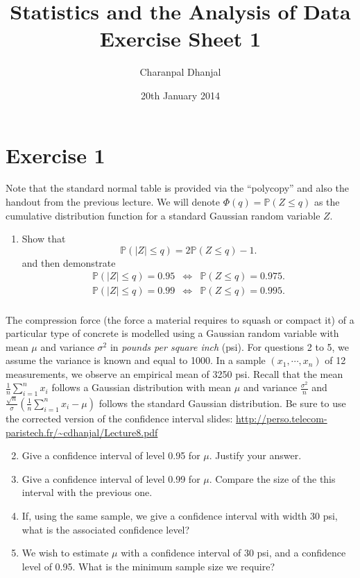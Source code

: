 \documentclass[a4paper,10pt]{article}
\title{Statistics and the Analysis of Data\\ Exercise Sheet 1}
\author{Charanpal Dhanjal}
\begin{document}
\date{20th January 2014}
\maketitle

\section*{Exercise 1}

Note that the standard normal table is provided via the ``polycopy'' and also the handout from the previous lecture. We will denote $\Phi(q)= \mathbb{P}(Z\le q)$ as the cumulative distribution function for a standard Gaussian random variable $Z$. 

\begin{enumerate} 
 

\item  Show that
\begin{equation}\label{eq:quantile}
\mathbb{P} (|Z|\le q) = 2 \mathbb{P} (Z\le q) -1.
\end{equation}
and then demonstrate
\begin{eqnarray*}
\mathbb{P}(|Z|\le q ) = 0.95 &\Leftrightarrow & \mathbb{P} ( Z\le q) = 0.975.\\
\mathbb{P}(|Z|\le q ) = 0.99 &\Leftrightarrow & \mathbb{P} ( Z\le q) = 0.995.\\
\end{eqnarray*}
\end{enumerate}

The compression force (the force a material requires to squash or compact it) of a particular type of concrete is modelled using a Gaussian random variable with mean $\mu$ and variance $\sigma^2$ in \emph{pounds per square inch} (psi). For questions 2 to 5, we assume the variance is known and equal to 1000. In a sample $(x_1,\cdots, x_n)$ of 12 measurements, we observe an empirical mean of 3250 psi. Recall that the mean $\frac 1n \sum_{i=1}^n x_i$ follows a Gaussian distribution with mean $\mu$ and variance $\frac{\sigma^2}n$ and $\frac{\sqrt{n}}{\sigma} \left( \frac 1n \sum_{i=1}^n x_i - \mu\right)$ follows the standard Gaussian distribution. Be sure to use the corrected version of the confidence interval slides: \url{http://perso.telecom-paristech.fr/~cdhanjal/Lecture8.pdf}

\begin{enumerate}
\setcounter{enumi}{1}
\item Give a confidence interval of level 0.95 for $\mu$. Justify your answer. 
\item Give a confidence interval of level 0.99 for $\mu$. Compare the size of the this interval with the previous one. 
\item If, using the same sample, we give a confidence interval with width 30 psi, what is the associated confidence level? 
\item We wish to estimate $\mu$ with a confidence interval of 30 psi, and a confidence level of 0.95. What is the minimum sample size we require? 
\end{enumerate}
\end{document}
